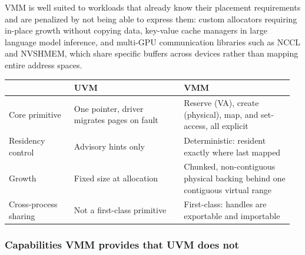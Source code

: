 VMM is well suited to workloads that already know their placement
requirements and are penalized by not being able to express them: custom
allocators requiring in-place growth without copying data, key-value cache
managers in large language model inference, and multi-GPU communication
libraries such as NCCL and NVSHMEM, which share specific buffers across
devices rather than mapping entire address spaces.

\begin{center}
\begin{tabular}{@{}p{0.22\linewidth}p{0.37\linewidth}p{0.37\linewidth}@{}}
\toprule
 & \textbf{UVM} & \textbf{VMM} \\
\midrule
Core primitive & One pointer, driver migrates pages on fault & Reserve (VA), create (physical), map, and set-access, all explicit \\
Residency control & Advisory hints only & Deterministic: resident exactly where last mapped \\
Growth & Fixed size at allocation & Chunked, non-contiguous physical backing behind one contiguous virtual range \\
Cross-process sharing & Not a first-class primitive & First-class: handles are exportable and importable \\
\bottomrule
\end{tabular}
\end{center}


\subsubsection{Capabilities VMM provides that UVM does not}


